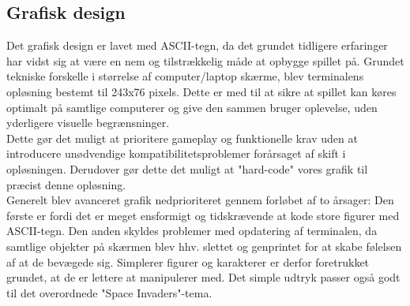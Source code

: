 \subsection{Grafisk design}
Det grafisk design er lavet med ASCII-tegn, da det grundet tidligere erfaringer har vidst sig at være en nem og tilstrækkelig måde at opbygge spillet på. Grundet tekniske forskelle i størrelse af computer/laptop skærme, blev terminalens opløsning bestemt til 243x76 pixels. Dette er med til at sikre at spillet kan køres optimalt på samtlige computerer og give den sammen bruger oplevelse, uden yderligere visuelle begrænsninger.\\


Dette gør det muligt at prioritere gameplay og funktionelle krav uden at introducere unødvendige kompatibilitetsproblemer forårsaget af skift i opløsningen. Derudover gør dette det muligt at "hard-code" vores grafik til præcist denne opløsning.\\
Generelt blev avanceret grafik nedprioriteret gennem forløbet af to årsager: Den første er fordi det er meget ensformigt og tidskrævende at kode store figurer med ASCII-tegn. Den anden skyldes problemer med opdatering af terminalen, da samtlige objekter på skærmen blev hhv. slettet og genprintet for at skabe følelsen af at de bevægede sig. Simplerer figurer og karakterer er derfor foretrukket grundet, at de er lettere at manipulerer med. Det simple udtryk passer også godt til det overordnede "Space Invaders"-tema.


